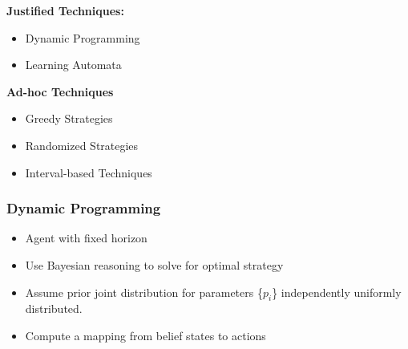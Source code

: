 \documentclass[	DIV=calc,%
				paper=a4,%
				fontsize=11pt,%
				twocolumn]{scrartcl}	 %
\begin{document}
\textbf{Justified Techniques:}
\begin{itemize}
	\item Dynamic Programming
	\item Learning Automata
\end{itemize}

\textbf{Ad-hoc Techniques}
\begin{itemize}
	\item Greedy Strategies
	\item Randomized Strategies
	\item Interval-based Techniques
\end{itemize}

\subsubsection{Dynamic Programming}
\begin{itemize}
	\item Agent with fixed horizon
	\item Use Bayesian reasoning to solve for optimal strategy
	\item Assume prior joint distribution for parameters \{$p_i$\} independently uniformly distributed.
	\item Compute a mapping from belief states to actions 
\end{itemize}
\end{document}

